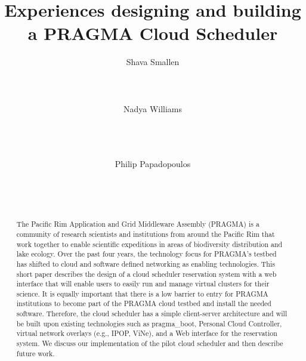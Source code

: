 \documentclass{acm_proc_article-sp}
\begin{document}
\sloppy %
\title{Experiences designing and building a PRAGMA Cloud Scheduler}


\author{
\alignauthor
Shava Smallen\\
      \\
      \\
      \\
\alignauthor
Nadya Williams\\
      \\
      \\
      \\
\and %
\alignauthor Philip Papadopoulos \\
      \\
      \\
      \\
}

\maketitle
\begin{abstract}
The Pacific Rim Application and Grid Middleware Assembly (PRAGMA) is a community of research scientists and institutions from around the Pacific Rim that work together to enable scientific expeditions in areas of biodiversity distribution and lake ecology.  Over the past four years, the technology focus for PRAGMA's testbed has shifted to cloud and software defined networking as enabling technologies.  This short paper describes the design of a cloud scheduler reservation system  with a web interface that will enable users to easily run and manage virtual clusters for their science.  It is equally important that there is a low barrier to entry for PRAGMA institutions to become part of the PRAGMA cloud testbed and install the needed software.  Therefore, the cloud scheduler  has a simple client-server architecture and will be built upon existing technologies such as pragma\_boot, Personal Cloud Controller,  virtual network overlays (e.g., IPOP, ViNe), and a Web  interface for the reservation system.  We discuss our implementation of the pilot cloud scheduler and then describe future work.   


\end{abstract}
\end{document}
